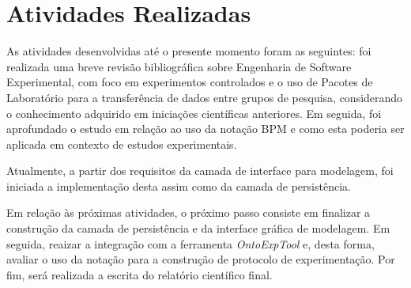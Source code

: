 \section{Atividades Realizadas}

As atividades desenvolvidas até o presente momento foram as seguintes: foi realizada uma breve revisão bibliográfica sobre Engenharia de Software Experimental, com foco em experimentos controlados e o uso de Pacotes de Laboratório para a transferência de dados entre grupos de pesquisa, considerando o conhecimento adquirido em iniciações científicas anteriores. Em seguida, foi aprofundado o estudo em relação ao uso da notação BPM e como esta poderia ser aplicada em contexto de estudos experimentais.

Atualmente, a partir dos requisitos da camada de interface para modelagem, foi iniciada a implementação desta assim como da camada de persistência.

Em relação às próximas atividades, o próximo passo consiste em finalizar a construção da camada de persistência e da interface gráfica de modelagem. Em seguida, reaizar a integração com a ferramenta \textit{OntoExpTool} e, desta forma, avaliar o uso da notação para a construção de protocolo de experimentação. Por fim, será realizada a escrita do relatório científico final.
